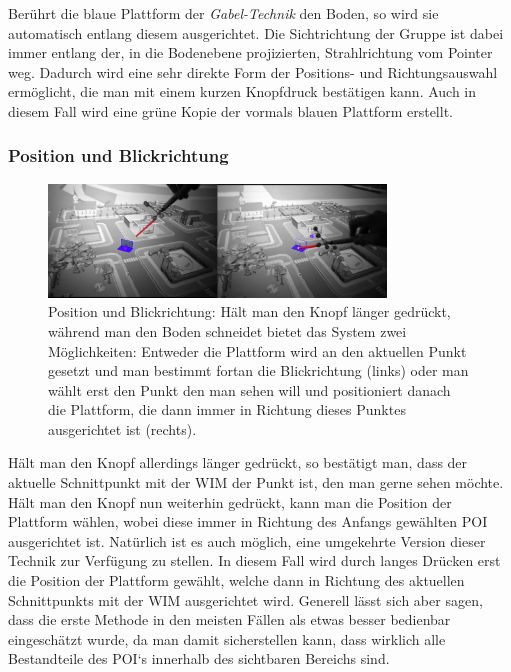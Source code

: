 Berührt die blaue Plattform der \textit{Gabel-Technik} den Boden, so wird sie automatisch entlang diesem ausgerichtet. Die Sichtrichtung der Gruppe ist dabei immer entlang der, in die Bodenebene projizierten, Strahlrichtung vom Pointer weg. Dadurch wird eine sehr direkte Form der Positions- und Richtungsauswahl ermöglicht, die man mit einem kurzen Knopfdruck bestätigen kann. Auch in diesem Fall wird eine grüne Kopie der vormals blauen Plattform erstellt.

\subsubsection{Position und Blickrichtung}

\begin{figure}[h]
  \centering
  \includegraphics[width=0.8\textwidth]{images/look.jpg}
  \caption{Position und Blickrichtung: Hält man den Knopf länger gedrückt, während man den Boden schneidet bietet das System zwei Möglichkeiten: Entweder die Plattform wird an den aktuellen Punkt gesetzt und man bestimmt fortan die Blickrichtung (links) oder man wählt erst den Punkt den man sehen will und positioniert danach die Plattform, die dann immer in Richtung dieses Punktes ausgerichtet ist (rechts).}
  \label{fig:todo}
\end{figure}


Hält man den Knopf allerdings länger gedrückt, so bestätigt man, dass der aktuelle Schnittpunkt mit der WIM der Punkt ist, den man gerne sehen möchte. Hält man den Knopf nun weiterhin gedrückt, kann man die Position der Plattform wählen, wobei diese immer in Richtung des Anfangs gewählten POI ausgerichtet ist.
Natürlich ist es auch möglich, eine umgekehrte Version dieser Technik zur Verfügung zu stellen. In diesem Fall wird durch langes Drücken erst die Position der Plattform gewählt, welche dann in Richtung des aktuellen Schnittpunkts mit der WIM ausgerichtet wird. 
Generell lässt sich aber sagen, dass die erste Methode in den meisten Fällen als etwas besser bedienbar eingeschätzt wurde, da man damit sicherstellen kann, dass wirklich alle Bestandteile des POI`s innerhalb des sichtbaren Bereichs sind.

